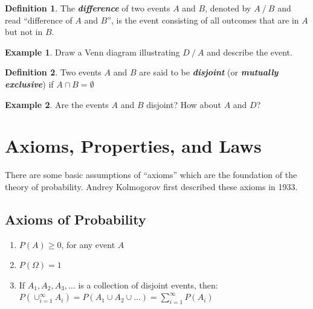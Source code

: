\documentclass[
  11pt,
]{book}
\providecommand{\tightlist}{%
  \setlength{\itemsep}{0pt}\setlength{\parskip}{0pt}}
\theoremstyle{definition}
\newtheorem{definition}{Definition}[chapter]
\theoremstyle{definition}
\newtheorem{example}{Example}[chapter]
\theoremstyle{definition}
\theoremstyle{definition}
\theoremstyle{remark}
\begin{document}
\hfill\break
\hfill\break
\hfill\break
\hfill\break
\hfill\break

\begin{definition}
The \textbf{\emph{difference}} of two events \(A\) and \(B\), denoted by \(A \mathbin{/} B\) and read ``difference of \(A\) and \(B\)'', is
the event consisting of all outcomes that are in \(A\) but not in \(B\).
\end{definition}

\begin{example}
Draw a Venn diagram illustrating \(D \mathbin{/} A\) and describe the event.
\end{example}

\hfill\break
\hfill\break
\hfill\break
\hfill\break
\hfill\break

\begin{definition}
Two events \(A\) and \(B\) are said to be \textbf{\emph{disjoint}} (or \textbf{\emph{mutually exclusive}}) if \(A \cap B = \emptyset\)
\end{definition}

\begin{example}
Are the events \(A\) and \(B\) disjoint? How about \(A\) and \(D\)?
\end{example}

\hfill\break
\hfill\break
\hfill\break
\hfill\break
\hfill\break

\newpage

\hypertarget{axioms-properties-and-laws}{%
\section{Axioms, Properties, and Laws}\label{axioms-properties-and-laws}}

There are some basic assumptions of ``axioms'' which are the foundation of the theory of probability. Andrey Kolmogorov first described these axioms in 1933.

\hypertarget{axioms-of-probability}{%
\subsection{Axioms of Probability}\label{axioms-of-probability}}

\begin{enumerate}
\def\labelenumi{\arabic{enumi}.}
\tightlist
\item
  \(P(A) \geq 0\), for any event \(A\)\\
\item
  \(P(\Omega) = 1\)\\
\item
  If \(A_1, A_2, A_3, \ldots\) is a collection of disjoint events, then:\\
  \(P(\cup_{i=1}^{\infty} A_i) = P(A_1 \cup A_2 \cup \ldots ) = \sum_{i=1}^{\infty} P(A_i)\)
\end{enumerate}
\end{document}
